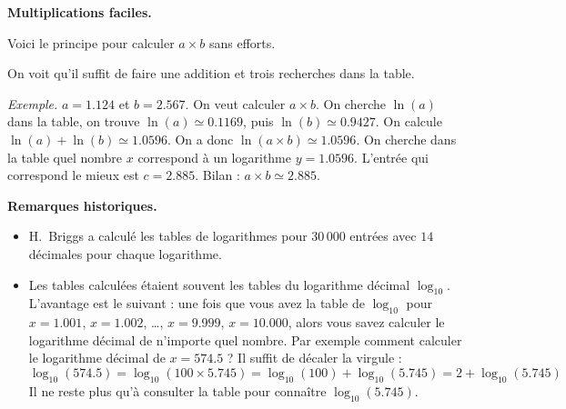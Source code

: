 \documentclass[11pt,class=report,crop=false]{standalone}
\begin{document}
\begin{cours}
\begin{itemize}
\end{itemize}

\bigskip

\textbf{Multiplications faciles.}

Voici le principe pour calculer $a\times b$ sans efforts.



On voit qu'il suffit de faire une addition et trois recherches dans la table.

\emph{Exemple.} $a=1.124$ et $b=2.567$. On veut calculer $a \times b$.
On cherche $\ln(a)$ dans la table, on trouve $\ln(a) \simeq 0.1169$, puis $\ln(b) \simeq 0.9427$. On calcule $\ln(a)+\ln(b) \simeq 1.0596$.
On a donc $\ln(a\times b) \simeq 1.0596$. On cherche dans la table quel nombre $x$ correspond à un logarithme $y=1.0596$. L'entrée qui correspond le mieux est $c=2.885$. Bilan : $a\times b \simeq 2.885$.
 
 \bigskip

\textbf{Remarques historiques.}

\begin{itemize}
  \item H.~Briggs a calculé les tables de logarithmes pour $30\,000$ entrées avec $14$ décimales pour chaque logarithme.
  
  \item Les tables calculées étaient souvent les tables du logarithme décimal $\log_{10}$. L'avantage est le suivant :
  une fois que vous avez la table de $\log_{10}$ pour $x=1.001$, $x=1.002$, \ldots, $x=9.999$, $x=10.000$, alors vous savez calculer le logarithme décimal de n'importe quel nombre.
  Par exemple comment calculer le logarithme décimal de $x =  574.5$ ? Il suffit de décaler la virgule :
  $$\log_{10}(574.5) = \log_{10}(100 \times 5.745)
  =\log_{10}(100) + \log_{10}(5.745) = 2 + \log_{10}(5.745)$$
  Il ne reste plus qu'à consulter la table pour connaître $\log_{10}(5.745)$.
     
\end{itemize}

\end{cours}


\end{document}
